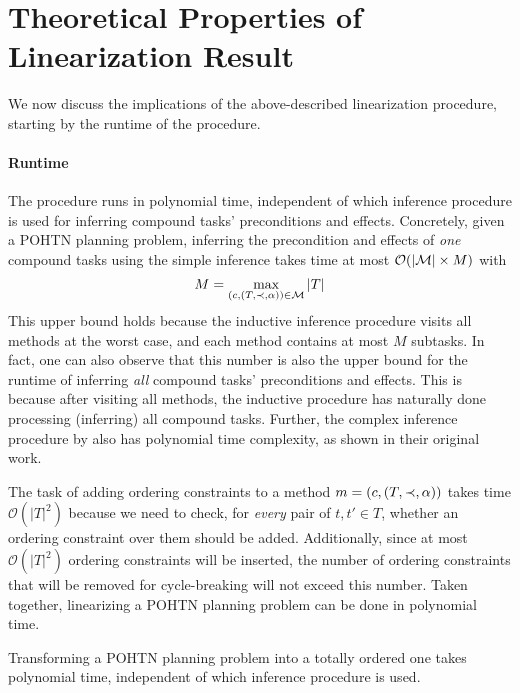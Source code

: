 \section{Theoretical Properties of Linearization Result}

We now discuss the implications of the above-described linearization procedure, starting by the runtime of the procedure.

\paragraph{Runtime} The procedure runs in polynomial time, independent of which inference procedure is used for inferring compound tasks' preconditions and effects. Concretely, given a POHTN planning problem, inferring the precondition and effects of \emph{one} compound tasks using the simple inference takes time at most $\mathcal{O}(|\mathcal{M}{}| \times M)$ with
\begin{displaymath}
	M =  \max_{(c, (T, \mathord{\prec}{}, \alpha)) \in \mathcal{M}{}} |T|
\end{displaymath}
This upper bound holds because the inductive inference procedure visits all methods at the worst case, and each method contains at most $M$ subtasks. In fact, one can also observe that this number is also the upper bound for the runtime of inferring \emph{all} compound tasks' preconditions and effects. This is because after visiting all methods, the inductive procedure has naturally done processing (inferring) all compound tasks. Further, the complex inference procedure by  also has polynomial time complexity, as shown in their original work.

The task of adding ordering constraints to a method $m = (c, (T, \mathord{\prec}{}, \alpha))$ takes time $\mathcal{O}(|T|^{2})$ because we need to check, for \emph{every} pair of $t, t' \in T$, whether an ordering constraint over them should be added. Additionally, since at most $\mathcal{O}(|T|^{2})$ ordering constraints will be inserted, the number of ordering constraints that will be removed for cycle-breaking will not exceed this number. Taken together, linearizing a POHTN planning problem can be done in polynomial time.

\begin{theorem}\label{thm:Runtime}
	Transforming a POHTN planning problem into a totally ordered one takes polynomial time, independent of which inference procedure is used.
\end{theorem}

